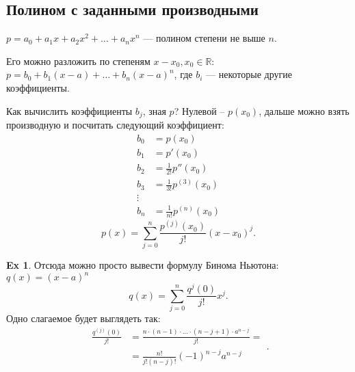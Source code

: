 \documentclass[11pt]{book}
\newcommand{\R}{\mathbb{R}}
\theoremstyle{definition}
\theoremstyle{plain}
\theoremstyle{plain}
\theoremstyle{definition}
\newtheorem*{ex}{Ex}
\theoremstyle{remark}
\begin{document}
\subsection{Полином с заданными производными}
\begin{defn}
$p = a_0 + a_1x + a_2 x^2 + \dots + a_nx^n$ --- полином степени не выше $n$. 

Его можно разложить по степеням $x - x_0, x_0 \in \R$:
$p = b_0 + b_1(x - a) + \ldots + b_n(x - a)^n$, где $ b_i$ --- некоторые другие коэффициенты.

Как вычислить коэффициенты $ b_j$, зная  $ p$?
Нулевой -- $ p(x_0)$,  дальше можно взять производную и посчитать следующий коэффициент:
$$
\begin{aligned}
    b_0 &= p(x_0)\\  
    b_1 &= p'(x_0) \\
    b_2 &= \frac{1}{2!} p''(x_0) \\
    b_3 &= \frac{1}{3!}p^{(3)}(x_0) \\
    \vdots \\
    b_{n} &= \frac{1}{n!}p^{(n)}(x_0)
\end{aligned}
$$
\[
    p(x) = \sum_{j=0}^{n} \frac{p^{(j)}(x_0)}{j!} (x-x_0)^{j}
.\] 
\end{defn}
\begin{ex}
Отсюда можно просто вывести формулу Бинома Ньютона:
$ q (x) = (x-a)^{n}$
\[
    q(x) = \sum_{j=0}^{n}\frac{q^{j}(0)}{j!}x^{j}
.\] 
Одно слагаемое будет выглядеть так:
\[
    \begin{aligned}
	\frac{q^{(j)}(0)}{j!} &= \frac{n \cdot (n-1) \cdot \ldots \cdot (n- j +1) \cdot a^{n-j}}{j!} = \\
			      &= \frac{n!}{j! (n-j)!}(-1)^{n-j} a^{n-j}
    \end{aligned}
.\] 
\end{ex}
\end{document}
